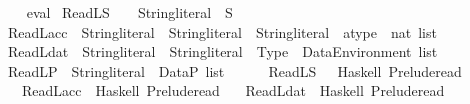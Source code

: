 \begin{isabellebody}
%
\isadelimproof
\ \ %
\endisadelimproof
%
\isatagproof
{}\isamarkupfalse%
\ {\isacharparenleft}{\kern0pt}eval{\isacharparenright}{\kern0pt}%
\endisatagproof
{\isafoldproof}%
%
\isadelimproof
%
\endisadelimproof
%
\isadelimdocument
%
\endisadelimdocument
%
\isatagdocument
%
\isamarkuptrue%
%
\endisatagdocument
{\isafolddocument}%
%
\isadelimdocument
%
\endisadelimdocument
{}\isamarkupfalse%
\ ReadL\isactrlsub S\ \ \ {\isacharcolon}{\kern0pt}{\isacharcolon}{\kern0pt}\ {\isachardoublequoteopen}String{\isachardot}{\kern0pt}literal\ {\isasymRightarrow}\ S{\isachardoublequoteclose}\isanewline
{}\isamarkupfalse%
\ ReadL\isactrlsub a\isactrlsub c\isactrlsub c\ {\isacharcolon}{\kern0pt}{\isacharcolon}{\kern0pt}\ {\isachardoublequoteopen}String{\isachardot}{\kern0pt}literal\ {\isasymRightarrow}\ {\isacharparenleft}{\kern0pt}String{\isachardot}{\kern0pt}literal\ {\isasymtimes}\ String{\isachardot}{\kern0pt}literal\ {\isasymtimes}\ atype\ {\isasymtimes}\ nat{\isacharparenright}{\kern0pt}\ list{\isachardoublequoteclose}\isanewline
{}\isamarkupfalse%
\ ReadL\isactrlsub d\isactrlsub a\isactrlsub t\ {\isacharcolon}{\kern0pt}{\isacharcolon}{\kern0pt}\ {\isachardoublequoteopen}String{\isachardot}{\kern0pt}literal\ {\isasymRightarrow}\ {\isacharparenleft}{\kern0pt}String{\isachardot}{\kern0pt}literal\ {\isasymtimes}\ Type\ {\isasymtimes}\ Data\isactrlsub E\isactrlsub n\isactrlsub v\isactrlsub i\isactrlsub r\isactrlsub o\isactrlsub n\isactrlsub m\isactrlsub e\isactrlsub n\isactrlsub t{\isacharparenright}{\kern0pt}\ list{\isachardoublequoteclose}\isanewline
{}\isamarkupfalse%
\ ReadL\isactrlsub P\ {\isacharcolon}{\kern0pt}{\isacharcolon}{\kern0pt}\ {\isachardoublequoteopen}String{\isachardot}{\kern0pt}literal\ {\isasymRightarrow}\ Data\isactrlsub P\ list{\isachardoublequoteclose}\isanewline
\isanewline
{}\isamarkupfalse%
\ \isanewline
\ \ \ \ ReadL\isactrlsub S\ \ {\isasymrightharpoonup}\ {\isacharparenleft}{\kern0pt}Haskell{\isacharparenright}{\kern0pt}\ {\isachardoublequoteopen}Prelude{\isachardot}{\kern0pt}read{\isachardoublequoteclose}\isanewline
\ {\isacharbar}{\kern0pt}\ \ ReadL\isactrlsub a\isactrlsub c\isactrlsub c\ {\isasymrightharpoonup}\ {\isacharparenleft}{\kern0pt}Haskell{\isacharparenright}{\kern0pt}\ {\isachardoublequoteopen}Prelude{\isachardot}{\kern0pt}read{\isachardoublequoteclose}\isanewline
\ {\isacharbar}{\kern0pt}\ \ ReadL\isactrlsub d\isactrlsub a\isactrlsub t\ {\isasymrightharpoonup}\ {\isacharparenleft}{\kern0pt}Haskell{\isacharparenright}{\kern0pt}\ {\isachardoublequoteopen}Prelude{\isachardot}{\kern0pt}read{\isachardoublequoteclose}\isanewline

\end{isabellebody}
